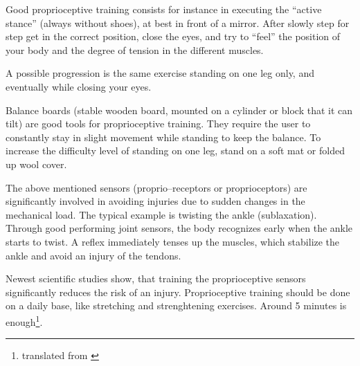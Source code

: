 \documentclass[../main.tex]{subfiles}
\begin{document}
Good proprioceptive training\label{Ex:Proprioceptive} consists for instance in executing the ``active stance'' (always without shoes), at best in front of a mirror.
After slowly step for step get in the correct position, close the eyes, and try to ``feel''  the position of your body and the degree of tension in the different muscles.

A possible progression is the same exercise standing on one leg only, and eventually while closing your eyes.

Balance boards (stable wooden board, mounted on a cylinder or block that it can tilt) are good tools for proprioceptive training.
They require the user to constantly stay in slight movement while standing to keep the balance.
To increase the difficulty level of standing on one leg, stand on a soft mat   or folded up wool cover.

The above mentioned sensors (proprio--receptors or proprioceptors) are significantly involved in avoiding injuries due to sudden changes in the mechanical load.
The typical example is twisting the ankle (sublaxation). Through good performing joint sensors, the body recognizes early when the ankle starts to twist. A reflex immediately tenses up the muscles, which stabilize the ankle and avoid an injury of the tendons.

Newest scientific studies show, that training the proprioceptive sensors significantly reduces the risk of an injury.
Proprioceptive training should be done on a daily base, like stretching and strenghtening exercises.
Around 5 minutes is enough\footnote{translated from \cite{Saarland}}.
\end{document}

